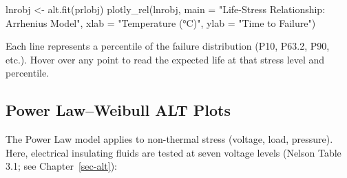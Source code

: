 \documentclass[
  letterpaper,
  DIV=11,
  numbers=noendperiod]{scrreprt}
\newenvironment{Shaded}{\begin{snugshade}}{\end{snugshade}}
\newcommand{\AttributeTok}[1]{\textcolor[rgb]{0.40,0.45,0.13}{#1}}
\newcommand{\FunctionTok}[1]{\textcolor[rgb]{0.28,0.35,0.67}{#1}}
\newcommand{\NormalTok}[1]{\textcolor[rgb]{0.00,0.23,0.31}{#1}}
\newcommand{\OtherTok}[1]{\textcolor[rgb]{0.00,0.23,0.31}{#1}}
\newcommand{\StringTok}[1]{\textcolor[rgb]{0.13,0.47,0.30}{#1}}
\begin{document}
\begin{Shaded}
\begin{Highlighting}[]
\NormalTok{lnrobj }\OtherTok{\textless{}{-}} \FunctionTok{alt.fit}\NormalTok{(prlobj)}
\FunctionTok{plotly\_rel}\NormalTok{(lnrobj,}
           \AttributeTok{main =} \StringTok{"Life{-}Stress Relationship: Arrhenius Model"}\NormalTok{,}
           \AttributeTok{xlab =} \StringTok{"Temperature (°C)"}\NormalTok{,}
           \AttributeTok{ylab =} \StringTok{"Time to Failure"}\NormalTok{)}
\end{Highlighting}
\end{Shaded}

Each line represents a percentile of the failure distribution (P10,
P63.2, P90, etc.). Hover over any point to read the expected life at
that stress level and percentile.

\subsection{Power Law--Weibull ALT
Plots}\label{power-lawweibull-alt-plots}

The Power Law model applies to non-thermal stress (voltage, load,
pressure). Here, electrical insulating fluids are tested at seven
voltage levels (Nelson Table 3.1; see Chapter~\ref{sec-alt}):
\end{document}
